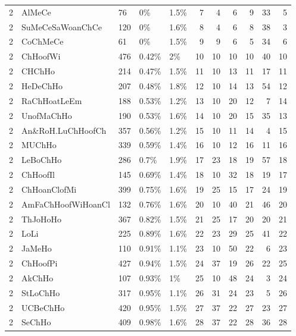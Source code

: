 \begin{longtable}{lllllrrrrrr}
  2 & AlMeCe & 76 & 0\% & 1.5\% &   7 &   4 &   6 &   9 &  33 &   5 \\ 
  2 & SuMeCeSaWoanChCe & 120 & 0\% & 1.6\% &   8 &   4 &   6 &   8 &  38 &   3 \\ 
  2 & CoChMeCe & 61 & 0\% & 1.5\% &   9 &   9 &   6 &   5 &  34 &   6 \\ 
  2 & ChHoofWi & 476 & 0.42\% & 2\% &  10 &  10 &  10 &  10 &  40 &  10 \\ 
  2 & CHChHo & 214 & 0.47\% & 1.5\% &  11 &  10 &  13 &  11 &  17 &  11 \\ 
  2 & HeDeChHo & 207 & 0.48\% & 1.8\% &  12 &  10 &  14 &  13 &  54 &  12 \\ 
  2 & RaChHoatLeEm & 188 & 0.53\% & 1.2\% &  13 &  10 &  20 &  12 &   7 &  14 \\ 
  2 & UnofMaChHo & 190 & 0.53\% & 1.6\% &  14 &  10 &  20 &  15 &  35 &  13 \\ 
  2 & An\&RoH.LuChHoofCh & 357 & 0.56\% & 1.2\% &  15 &  10 &  11 &  14 &   4 &  15 \\ 
  2 & MUChHo & 339 & 0.59\% & 1.4\% &  16 &  10 &  12 &  16 &  11 &  16 \\ 
  2 & LeBoChHo & 286 & 0.7\% & 1.9\% &  17 &  23 &  18 &  19 &  57 &  18 \\ 
  2 & ChHoofIl & 145 & 0.69\% & 1.4\% &  18 &  10 &  32 &  18 &  19 &  17 \\ 
  2 & ChHoanClofMi & 399 & 0.75\% & 1.6\% &  19 &  25 &  15 &  17 &  24 &  19 \\ 
  2 & AmFaChHoofWiHoanCl & 132 & 0.76\% & 1.6\% &  20 &  10 &  40 &  21 &  46 &  20 \\ 
  2 & ThJoHoHo & 367 & 0.82\% & 1.5\% &  21 &  25 &  17 &  20 &  20 &  21 \\ 
  2 & LoLi & 225 & 0.89\% & 1.6\% &  22 &  23 &  29 &  25 &  41 &  22 \\ 
  2 & JaMeHo & 110 & 0.91\% & 1.1\% &  23 &  10 &  50 &  22 &   6 &  23 \\ 
  2 & ChHoofPi & 427 & 0.94\% & 1.5\% &  24 &  37 &  19 &  26 &  22 &  25 \\ 
  2 & AkChHo & 107 & 0.93\% & 1\% &  25 &  10 &  48 &  24 &   3 &  24 \\ 
  2 & StLoChHo & 317 & 0.95\% & 1.1\% &  26 &  31 &  24 &  23 &   5 &  26 \\ 
  2 & UCBeChHo & 420 & 0.95\% & 1.5\% &  27 &  37 &  22 &  27 &  23 &  27 \\ 
  2 & SeChHo & 409 & 0.98\% & 1.6\% &  28 &  37 &  22 &  28 &  36 &  28 \\ 

\end{longtable}
